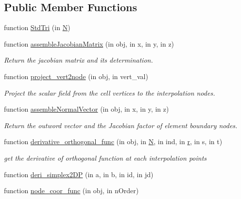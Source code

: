 \subsection*{Public Member Functions}
\begin{DoxyCompactItemize}
\item 
function \hyperlink{class_std_tri_a98570ecce87558063fdce055072c13fb}{Std\+Tri} (in \hyperlink{class_std_cell_a8df35ad5169af36d3dff62644f7878c9}{N})
\item 
function \hyperlink{class_std_tri_a979cf5dad51e459901fde2ce1c4c47b3}{assemble\+Jacobian\+Matrix} (in obj, in x, in y, in z)
\begin{DoxyCompactList}\small\item\em Return the jacobian matrix and its determination. \end{DoxyCompactList}\item 
function \hyperlink{class_std_tri_a0d73b92e3c0be5dd12f55c25494cb938}{project\+\_\+vert2node} (in obj, in vert\+\_\+val)
\begin{DoxyCompactList}\small\item\em Project the scalar field from the cell vertices to the interpolation nodes. \end{DoxyCompactList}\item 
function \hyperlink{class_std_tri_aa9616b2c4a0a6c5eefb650614400c94b}{assemble\+Normal\+Vector} (in obj, in x, in y, in z)
\begin{DoxyCompactList}\small\item\em Return the outword vector and the Jacobian factor of element boundary nodes. \end{DoxyCompactList}\item 
function \hyperlink{class_std_tri_acd2a4b37915d9b8a1db6fc2788071811}{derivative\+\_\+orthogonal\+\_\+func} (in obj, in \hyperlink{class_std_cell_a8df35ad5169af36d3dff62644f7878c9}{N}, in ind, in \hyperlink{class_std_cell_a737dd2feb25f74be0215a594334ec622}{r}, in s, in t)
\begin{DoxyCompactList}\small\item\em get the derivative of orthogonal function at each interpolation points \end{DoxyCompactList}\item 
function \hyperlink{class_std_tri_ae7d2902e7bbedc608f427a982e732975}{deri\+\_\+simplex2\+DP} (in a, in b, in id, in jd)
\item 
function \hyperlink{class_std_tri_a879965bd7ce81d0f941320cb3d3250d8}{node\+\_\+coor\+\_\+func} (in obj, in n\+Order)

\end{DoxyCompactItemize}

